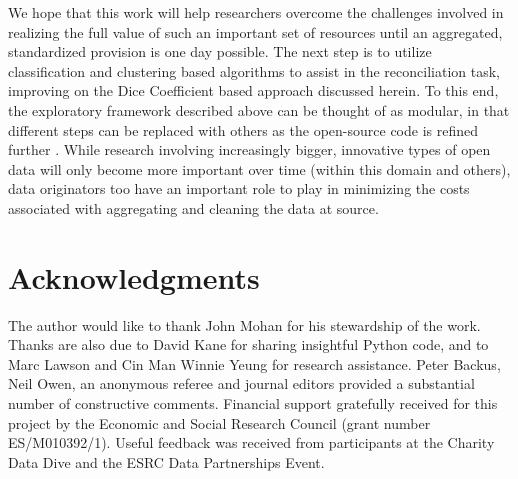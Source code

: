 \documentclass[11pt]{article}
\begin{document}
We hope that this work will help researchers overcome the challenges involved in realizing the full value of such an important set of resources until an aggregated, standardized provision is one day possible. The next step is to utilize classification and clustering based algorithms to assist in the reconciliation task, improving on the Dice Coefficient based approach discussed herein. To this end, the exploratory framework described above can be thought of as modular, in that different steps can be replaced with others as the open-source code is refined further \cite[such as a methodological advancement similar to][]{imai2017}. While research involving increasingly bigger, innovative types of open data will only become more important over time (within this domain and others), data originators too have an important role to play in minimizing the costs associated with aggregating and cleaning the data at source.

\section*{Acknowledgments}\label{methods_acknowledgements}

The author would like to thank John Mohan for his stewardship of the work. Thanks are also due to David Kane for sharing insightful Python code, and to Marc Lawson and Cin Man Winnie Yeung for research assistance. Peter Backus, Neil Owen, an anonymous referee and journal editors provided a substantial number of constructive comments. Financial support gratefully received for this project by the Economic and Social Research Council (grant number ES/M010392/1). Useful feedback was received from participants at the Charity Data Dive and the ESRC Data Partnerships Event.

\small


\label{sec:Bibliography}
\end{document}

